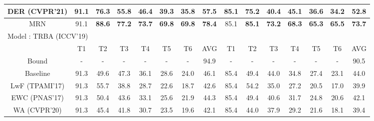 \documentclass[10pt,twocolumn,letterpaper]{article}
\begin{document}
\begin{table*}[]
\begin{center}
{\begin{tabular}{ccccccccccccccc}
\multicolumn{1}{c|}{DER (CVPR'21)\cite{Yan2021DER}}      & 91.1 & 76.3          & 55.8          & 46.4          & 39.3          & 35.8          & \multicolumn{1}{c|}{57.5}          & 85.1 & 75.2          & 40.4          & 45.1          & 36.6          & 34.2          & 52.8          \\ \hline
\multicolumn{1}{c|}{MRN}     & 91.1 & \textbf{88.6} & \textbf{77.2} & \textbf{73.7} & \textbf{69.8} & \textbf{69.8} & \multicolumn{1}{c|}{\textbf{78.4}} & 85.1 & \textbf{85.1} & \textbf{73.2} & \textbf{68.3} & \textbf{65.3} & \textbf{65.5} & \textbf{73.7} \\ \hline
\hline
\multicolumn{15}{l}{Model : TRBA (ICCV'19) \cite{Baekwhats_wrong_19ICCV} }                                                                                      \\ \hline
\multicolumn{1}{c|}{}         & T1   & T2            & T3            & T4            & T5            & T6            & \multicolumn{1}{c|}{AVG}           & T1   & T2            & T3            & T4            & T5            & T6            & AVG           \\ \hline
\multicolumn{1}{c|}{Bound}    & -    & -             & -             & -             & -             & -             & \multicolumn{1}{c|}{94.9}          & -    & -             & -             & -             & -             & -             & 90.5          \\
\multicolumn{1}{c|}{Baseline} & 91.3 & 49.6          & 47.3          & 36.1          & 28.6          & 24.0          & \multicolumn{1}{c|}{46.1}          & 85.4 & 49.4          & 44.0          & 34.8          & 27.4          & 23.1          & 44.0          \\ \hline
\multicolumn{1}{c|}{LwF (TPAMI'17)\cite{Li2017LWF}}      & 91.3 & 55.7          & 38.8          & 28.7          & 22.6          & 18.7          & \multicolumn{1}{c|}{42.6}          & 85.4 & 54.2          & 35.0          & 27.2          & 20.5          & 17.0          & 39.9          \\
\multicolumn{1}{c|}{EWC (PNAS'17)\cite{kirkpatrick2017ewc}}      & 91.3 & 50.4          & 43.6          & 33.1          & 25.6          & 21.9          & \multicolumn{1}{c|}{44.3}          & 85.4 & 49.4          & 40.6          & 31.7          & 24.8          & 20.6          & 42.1          \\
\multicolumn{1}{c|}{WA (CVPR'20) \cite{zhao2020wa}}       & 91.3 & 45.4          & 41.8          & 30.7          & 23.5          & 19.6          & \multicolumn{1}{c|}{42.1}          & 85.4 & 44.0          & 37.9          & 29.2          & 21.6          & 18.1          & 39.4          \\

\end{tabular}}
\end{center}
\end{table*}
\end{document}
